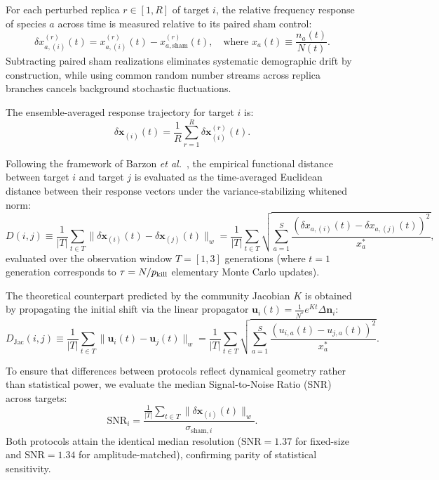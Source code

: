 \documentclass[11pt,a4paper]{article}
\newcommand{\pk}{p_{\rm kill}}
\begin{document}
For each perturbed replica $r \in [1, R]$ of target $i$, the relative frequency response of species $a$ across time is measured relative to its paired sham control:
\begin{equation}
\delta x_{a,(i)}^{(r)}(t) = x_{a,(i)}^{(r)}(t) - x_{a,\mathrm{sham}}^{(r)}(t), \quad \text{where } x_a(t) \equiv \frac{n_a(t)}{N(t)}.
\label{eq:delta_x_replica}
\end{equation}
Subtracting paired sham realizations eliminates systematic demographic drift by construction, while using common random number streams across replica branches cancels background stochastic fluctuations.

The ensemble-averaged response trajectory for target $i$ is:
\begin{equation}
\delta\mathbf{x}_{(i)}(t) = \frac{1}{R} \sum_{r=1}^R \delta\mathbf{x}_{(i)}^{(r)}(t).
\end{equation}

Following the framework of Barzon \textit{et al.}~\cite{barzon2024unraveling}, the empirical functional distance between target $i$ and target $j$ is evaluated as the time-averaged Euclidean distance between their response vectors under the variance-stabilizing whitened norm:
\begin{equation}
D(i,j) \equiv \frac{1}{|T|} \sum_{t \in T} \|\delta\mathbf{x}_{(i)}(t) - \delta\mathbf{x}_{(j)}(t)\|_w = \frac{1}{|T|} \sum_{t \in T} \sqrt{ \sum_{a=1}^S \frac{\left( \delta x_{a,(i)}(t) - \delta x_{a,(j)}(t) \right)^2}{x_a^*} },
\label{eq:D_empirical_supp2}
\end{equation}
evaluated over the observation window $T = [1, 3]$ generations (where $t=1$ generation corresponds to $\tau = N/\pk$ elementary Monte Carlo updates).

The theoretical counterpart predicted by the community Jacobian $K$ is obtained by propagating the initial shift via the linear propagator $\mathbf{u}_i(t) = \frac{1}{N^*} e^{Kt} \Delta\mathbf{n}_i$:
\begin{equation}
D_{\mathrm{Jac}}(i,j) \equiv \frac{1}{|T|} \sum_{t \in T} \|\mathbf{u}_i(t) - \mathbf{u}_j(t)\|_w = \frac{1}{|T|} \sum_{t \in T} \sqrt{ \sum_{a=1}^S \frac{\left( u_{i,a}(t) - u_{j,a}(t) \right)^2}{x_a^*} }.
\label{eq:D_jac_supp2}
\end{equation}

To ensure that differences between protocols reflect dynamical geometry rather than statistical power, we evaluate the median Signal-to-Noise Ratio (SNR) across targets:
\begin{equation}
\mathrm{SNR}_i = \frac{\frac{1}{|T|} \sum_{t \in T} \|\delta\mathbf{x}_{(i)}(t)\|_w}{\sigma_{\mathrm{sham}, i}}.
\end{equation}
Both protocols attain the identical median resolution ($\mathrm{SNR} = 1.37$ for fixed-size and $\mathrm{SNR} = 1.34$ for amplitude-matched), confirming parity of statistical sensitivity.
\end{document}
